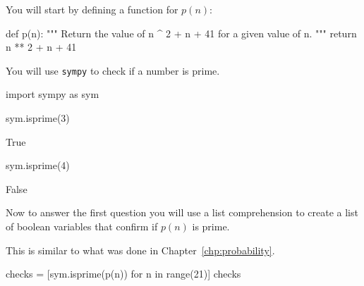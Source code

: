 You will start by defining a function for \(p(n)\):




\begin{pyin}
def p(n):
    """
    Return the value of n ^ 2 + n + 41 for a given value of n.
    """
    return n ** 2 + n + 41
\end{pyin}





You will use \texttt{sympy} to check if a number is prime.




\begin{pyin}
import sympy as sym

sym.isprime(3)
\end{pyin}





\begin{raw}
True
\end{raw}







\begin{pyin}
sym.isprime(4)
\end{pyin}





\begin{raw}
False
\end{raw}

Now to answer the first question you will use a list comprehension to create a
list of boolean variables that confirm if \(p(n)\) is prime.

\begin{note}
This is similar to what was done in Chapter~\ref{chp:probability}.
\end{note}


\begin{pyin}
checks = [sym.isprime(p(n)) for n in range(21)]
checks
\end{pyin}





\begin{raw}
\end{raw}





